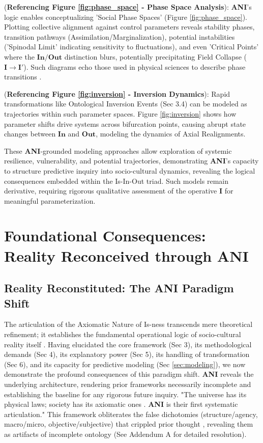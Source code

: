 \documentclass{article}
\newcommand{\ANI}{\textbf{ANI}}             %
\newcommand{\Isness}{\mathbf{I}}            %
\newcommand{\Inness}{\mathbf{In}}           %
\newcommand{\Outness}{\mathbf{Out}}         %
\begin{document}
(\textbf{Referencing Figure \ref{fig:phase_space} - Phase Space Analysis}): \ANI{}'s logic enables conceptualizing 'Social Phase Spaces' (Figure \ref{fig:phase_space}). Plotting collective alignment against control parameters reveals stability phases, transition pathways (Assimilation/Marginalization), potential instabilities ('Spinodal Limit' indicating sensitivity to fluctuations), and even 'Critical Points' where the $\Inness/\Outness$ distinction blurs, potentially precipitating Field Collapse ($\Isness \rightarrow \Isness'$). Such diagrams echo those used in physical sciences to describe phase transitions \citep{Prigogine1984}.

(\textbf{Referencing Figure \ref{fig:inversion} - Inversion Dynamics}): Rapid transformations like Ontological Inversion Events (Sec 3.4) can be modeled as trajectories within such parameter spaces. Figure \ref{fig:inversion} shows how parameter shifts drive systems across bifurcation points, causing abrupt state changes between $\Inness$ and $\Outness$, modeling the dynamics of Axial Realignments.

These \ANI{}-grounded modeling approaches allow exploration of systemic resilience, vulnerability, and potential trajectories, demonstrating \ANI{}'s capacity to structure predictive inquiry into socio-cultural dynamics, revealing the logical consequences embedded within the Is-In-Out triad. Such models remain derivative, requiring rigorous qualitative assessment of the operative $\Isness$ for meaningful parameterization.

\section{Foundational Consequences: Reality Reconceived through ANI}

\subsection{Reality Reconstituted: The ANI Paradigm Shift}

The articulation of the Axiomatic Nature of Is-ness transcends mere theoretical refinement; it establishes the fundamental operational logic of socio-cultural reality itself \citep{Searle1995, BergerLuckmann1966}. Having elucidated the core framework (Sec 3), its methodological demands (Sec 4), its explanatory power (Sec 5), its handling of transformation (Sec 6), and its capacity for predictive modeling (Sec \ref{sec:modeling}), we now demonstrate the profound consequences of this paradigm shift. \ANI{} reveals the underlying architecture, rendering prior frameworks necessarily incomplete and establishing the baseline for any rigorous future inquiry. "The universe has its physical laws; society has its axiomatic ones \citep{Hofstadter1979}. \ANI{} is their first systematic articulation." This framework obliterates the false dichotomies (structure/agency, macro/micro, objective/subjective) that crippled prior thought \citep{Giddens1984}, revealing them as artifacts of incomplete ontology (See Addendum A for detailed resolution).
\end{document}
